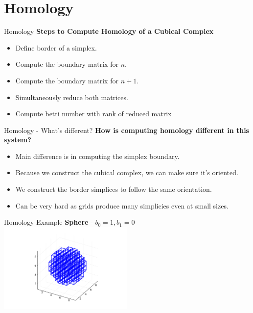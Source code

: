 \documentclass[aspectratio=169,xcolor=dvipsnames]{beamer}
\begin{document}
\section{Homology}

\begin{frame}{Homology}
    \textbf{Steps to Compute Homology of a Cubical Complex}
    \begin{itemize}
        \item Define border of a simplex.
        \item Compute the boundary matrix for $n$.
        \item Compute the boundary matrix for $n + 1$.
        \item Simultaneously reduce both matrices.
        \item Compute betti number with rank of reduced matrix
    \end{itemize}
\end{frame}

\begin{frame}{Homology - What's different?}
    \textbf{How is computing homology different in this system?}
    \begin{itemize}
        \item Main difference is in computing the simplex boundary.
        \item Because we construct the cubical complex, we can make sure it's oriented.
        \item We construct the border simplices to follow the same orientation.
        \item Can be very hard as grids produce many simplicies even at small sizes.
    \end{itemize}
\end{frame}

\begin{frame}{Homology Example}
    \textbf{Sphere} - $b_0 = 1, b_1 = 0$
    \vspace{1em}
    \centering
    \includegraphics[width=0.5\textwidth]{sphere.png}
\end{frame}
\end{document}
